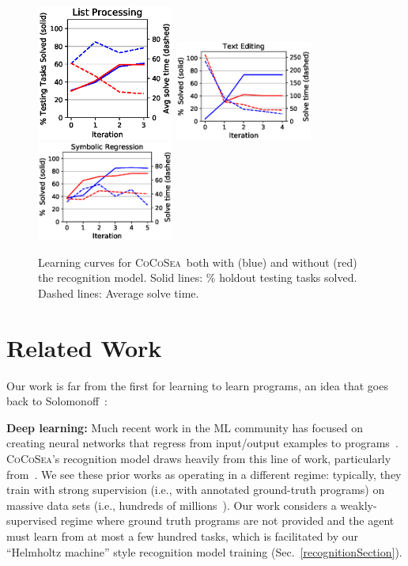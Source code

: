 \documentclass{article}
\newcommand{\system}{\textsc{CoCoSea}~}
\newcommand{\systemEnding}{\textsc{CoCoSea}}
\begin{document}
\begin{figure}\centering
  \includegraphics[width = 4.5cm]{figures/list.eps}
  \includegraphics[width = 4.5cm]{figures/textLearningCurve.eps}        
  \includegraphics[width = 4.5cm]{figures/rationalCurve.eps}   
  \caption{Learning curves for \system both with (blue) and without (red) the recognition model. Solid lines: \% holdout testing tasks solved. Dashed lines: Average solve time.}\label{learningCurves} 
\end{figure}

\section{Related Work}
 Our work is far from the first for learning to learn programs,
 an idea that goes back to Solomonoff~\cite{solomonoff1989system}:

 \noindent \textbf{Deep learning:} Much recent work in the ML community has
 focused on creating neural networks that regress from
 input/output examples to programs~\cite{devlin2017robustfill,devlin2017neural,menon2013machine,balog2016deepcoder}. %
\systemEnding's recognition model draws heavily from this line of work, particularly from~\cite{menon2013machine}.
We see these prior works as operating in a different regime: typically, they train with strong supervision (i.e., with annotated ground-truth programs) on massive data sets (i.e., hundreds of millions~\cite{devlin2017robustfill}).
 Our work   considers a weakly-supervised regime where ground truth programs are not provided and
 the agent must learn from at most a few hundred tasks,
 which is facilitated by our ``Helmholtz machine'' style recognition model training (Sec.~\ref{recognitionSection}).
 
\end{document}
